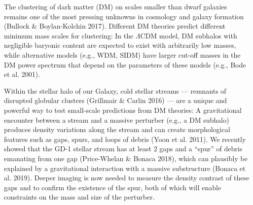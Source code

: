 \documentclass[11pt]{article}
\date{}
\author{}
\begin{document}
\maketitle

\vspace{-1em}
The clustering of dark matter (DM) on scales smaller than dwarf galaxies remains one of the most pressing unknowns in cosmology and galaxy formation (Bullock \& Boylan-Kolchin 2017).
Different DM theories predict different minimum mass scales for clustering: In the $\Lambda$CDM model, DM subhalos with negligible baryonic content are expected to exist with arbitrarily low masses, while alternative models (e.g., WDM, SIDM) have larger cut-off masses in the DM power spectrum that depend on the parameters of these models (e.g., Bode et al. 2001). %

Within the stellar halo of our Galaxy, cold stellar streams --- remnants of disrupted globular clusters (Grillmair \& Carlin 2016) --- are a unique and powerful way to test small-scale predictions from DM theories:
A gravitational encounter between a stream and a massive perturber (e.g., a DM subhalo) produces density variations along the stream and can create morphological features such as gaps, spurs, and loops of debris (Yoon et al. 2011). %
We recently showed that the GD-1 stellar stream has at least 2 gaps and a ``spur'' of debris emanating from one gap (Price-Whelan \& Bonaca 2018), which can plausibly be explained by a gravitational interaction with a massive substructure (Bonaca et al. 2019).
Deeper imaging is now needed to measure the density contrast of these gaps and to confirm the existence of the spur, both of which will enable constraints on the mass and size of the perturber.
\end{document}
